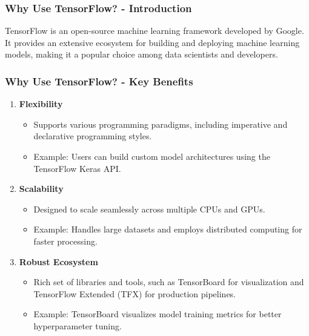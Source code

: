 \documentclass[aspectratio=169]{beamer}
\begin{document}
\begin{frame}[fragile]
    \frametitle{Why Use TensorFlow? - Introduction}
    TensorFlow is an open-source machine learning framework developed by Google. It provides an extensive ecosystem for building and deploying machine learning models, making it a popular choice among data scientists and developers.
\end{frame}

\begin{frame}[fragile]
    \frametitle{Why Use TensorFlow? - Key Benefits}
    \begin{enumerate}
        \item \textbf{Flexibility}
        \begin{itemize}
            \item Supports various programming paradigms, including imperative and declarative programming styles.
            \item Example: Users can build custom model architectures using the TensorFlow Keras API.
        \end{itemize}
        
        \item \textbf{Scalability}
        \begin{itemize}
            \item Designed to scale seamlessly across multiple CPUs and GPUs.
            \item Example: Handles large datasets and employs distributed computing for faster processing.
        \end{itemize}
        
        \item \textbf{Robust Ecosystem}
        \begin{itemize}
            \item Rich set of libraries and tools, such as TensorBoard for visualization and TensorFlow Extended (TFX) for production pipelines.
            \item Example: TensorBoard visualizes model training metrics for better hyperparameter tuning.
        \end{itemize}
    \end{enumerate}
\end{frame}
\end{document}
